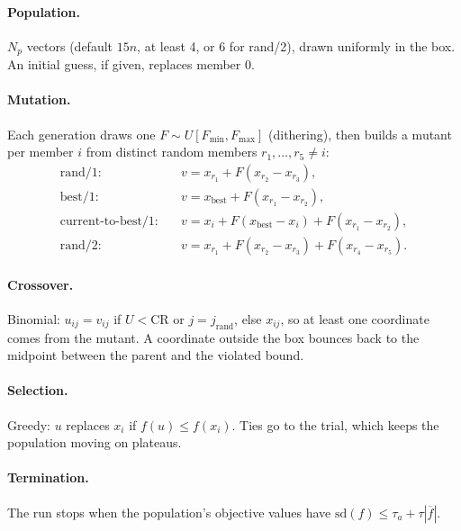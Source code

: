 \paragraph{Population.} $N_p$ vectors (default $15n$, at least 4, or 6 for rand/2), drawn
uniformly in the box. An initial guess, if given, replaces member 0.

\paragraph{Mutation.} Each generation draws one $F\sim U[F_{\min},F_{\max}]$ (dithering),
then builds a mutant per member $i$ from distinct random members $r_1,\dots,r_5\ne i$:
\begin{align*}
  \text{rand/1:}\quad& v=x_{r_1}+F(x_{r_2}-x_{r_3}),\\
  \text{best/1:}\quad& v=x_{\text{best}}+F(x_{r_1}-x_{r_2}),\\
  \text{current-to-best/1:}\quad& v=x_i+F(x_{\text{best}}-x_i)+F(x_{r_1}-x_{r_2}),\\
  \text{rand/2:}\quad& v=x_{r_1}+F(x_{r_2}-x_{r_3})+F(x_{r_4}-x_{r_5}).
\end{align*}

\paragraph{Crossover.} Binomial: $u_{ij}=v_{ij}$ if $U<\mathrm{CR}$ or $j=j_{\text{rand}}$,
else $x_{ij}$, so at least one coordinate comes from the mutant. A coordinate outside the
box bounces back to the midpoint between the parent and the violated bound.

\paragraph{Selection.} Greedy: $u$ replaces $x_i$ if $f(u)\le f(x_i)$. Ties go to the trial,
which keeps the population moving on plateaus.

\paragraph{Termination.} The run stops when the population's objective values have
$\mathrm{sd}(f)\le\tau_a+\tau|\overline f|$.

